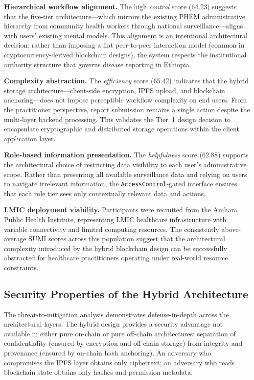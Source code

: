 \documentclass[AMA,LATO1COL]{WileyNJD-v2}
\begin{document}
\textbf{Hierarchical workflow alignment.} The high \emph{control} score (64.23) suggests that the five-tier architecture---which mirrors the existing PHEM administrative hierarchy from community health workers through national surveillance---aligns with users' existing mental models. This alignment is an intentional architectural decision: rather than imposing a flat peer-to-peer interaction model (common in cryptocurrency-derived blockchain designs), the system respects the institutional authority structure that governs disease reporting in Ethiopia.

\textbf{Complexity abstraction.} The \emph{efficiency} score (65.42) indicates that the hybrid storage architecture---client-side encryption, IPFS upload, and blockchain anchoring---does not impose perceptible workflow complexity on end users. From the practitioner perspective, report submission remains a single action despite the multi-layer backend processing. This validates the Tier~1 design decision to encapsulate cryptographic and distributed storage operations within the client application layer.

\textbf{Role-based information presentation.} The \emph{helpfulness} score (62.88) supports the architectural choice of restricting data visibility to each user's administrative scope. Rather than presenting all available surveillance data and relying on users to navigate irrelevant information, the \texttt{AccessControl}-gated interface ensures that each role tier sees only contextually relevant data and actions.

\textbf{LMIC deployment viability.} Participants were recruited from the Amhara Public Health Institute, representing LMIC healthcare infrastructure with variable connectivity and limited computing resources. The consistently above-average SUMI scores across this population suggest that the architectural complexity introduced by the hybrid blockchain design can be successfully abstracted for healthcare practitioners operating under real-world resource constraints.

\subsection{Security Properties of the Hybrid Architecture}\label{subsec:disc_security}

The threat-to-mitigation analysis demonstrates defense-in-depth across the architectural layers. The hybrid design provides a security advantage not available in either pure on-chain or pure off-chain architectures: separation of confidentiality (ensured by encryption and off-chain storage) from integrity and provenance (ensured by on-chain hash anchoring). An adversary who compromises the IPFS layer obtains only ciphertext; an adversary who reads blockchain state obtains only hashes and permission metadata.
\end{document}

